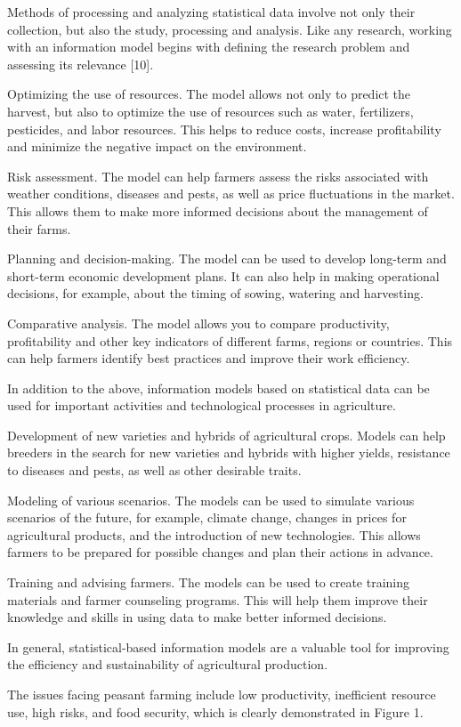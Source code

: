 \begin{multicols}{2}
Methods of processing and analyzing statistical data involve not only
their collection, but also the study, processing and analysis. Like any
research, working with an information model begins with defining the
research problem and assessing its relevance {[}10{]}.

Optimizing the use of resources. The model allows not only to predict
the harvest, but also to optimize the use of resources such as water,
fertilizers, pesticides, and labor resources. This helps to reduce
costs, increase profitability and minimize the negative impact on the
environment.

Risk assessment. The model can help farmers assess the risks associated
with weather conditions, diseases and pests, as well as price
fluctuations in the market. This allows them to make more informed
decisions about the management of their farms.

Planning and decision-making. The model can be used to develop long-term
and short-term economic development plans. It can also help in making
operational decisions, for example, about the timing of sowing, watering
and harvesting.

Comparative analysis. The model allows you to compare productivity,
profitability and other key indicators of different farms, regions or
countries. This can help farmers identify best practices and improve
their work efficiency.

In addition to the above, information models based on statistical data
can be used for important activities and technological processes in
agriculture.

Development of new varieties and hybrids of agricultural crops. Models
can help breeders in the search for new varieties and hybrids with
higher yields, resistance to diseases and pests, as well as other
desirable traits.

Modeling of various scenarios. The models can be used to simulate
various scenarios of the future, for example, climate change, changes in
prices for agricultural products, and the introduction of new
technologies. This allows farmers to be prepared for possible changes
and plan their actions in advance.

Training and advising farmers. The models can be used to create training
materials and farmer counseling programs. This will help them improve
their knowledge and skills in using data to make better informed
decisions.

In general, statistical-based information models are a valuable tool for
improving the efficiency and sustainability of agricultural production.

The issues facing peasant farming include low productivity, inefficient
resource use, high risks, and food security, which is clearly
demonstrated in Figure 1.
\end{multicols}

